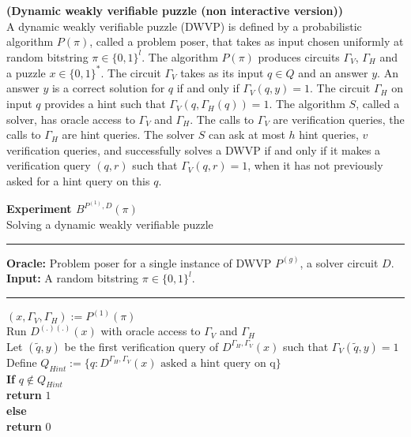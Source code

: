 %
%
%
\begin{definition} {\textbf{(Dynamic weakly verifiable puzzle (non interactive version))}}\\
  A dynamic weakly verifiable puzzle (DWVP) is defined by a probabilistic algorithm $P(\pi)$,
  called a problem poser, that takes as input chosen uniformly at random bitstring $\pi \in \{0,1\}^l$.
  The algorithm $P(\pi)$ produces circuits $\Gamma_{V}$, $\Gamma_{H}$ and a puzzle $x \in \{0,1\}^{*}$.
  The circuit $\Gamma_{V}$ takes as its input $q \in Q$ and an answer $y$.
  An answer $y$ is a correct solution for $q$ if and only if $\Gamma_V(q,y) = 1$.
  The circuit $\Gamma_H$ on input $q$ provides a hint such that $\Gamma_V(q,\Gamma_H(q)) = 1$.
  The algorithm $S$, called a solver, has oracle access to $\Gamma_V$ and $\Gamma_H$.
  The calls to $\Gamma_V$ are verification queries, the calls to $\Gamma_H$ are hint queries.
  The solver $S$ can ask at most $h$ hint queries, $v$ verification queries, and successfully solves a DWVP if and only if
  it makes a verification query $(q,r)$ such that $\Gamma_V(q,r) = 1$, when it has not previously asked for a hint query on this $q$.
\end{definition}
%
%
%
\begin{codeblock}
  \textbf{Experiment $B^{P^{(1)}, D}(\pi)$} \\
  Solving a dynamic weakly verifiable puzzle
  \medskip

  \hrule

  \medskip

  \textbf{Oracle:} Problem poser for a single instance of DWVP $P^{(g)}$, a solver circuit $D$. \\
  \textbf{Input:} A random bitstring $\pi \in \{0,1\}^{l}$.\\

  \medskip\hrule\medskip

  $(x, \Gamma_V, \Gamma_H) := P^{(1)}(\pi)$ \\
  Run $D^{(.)(.)}(x)$ with oracle access to $\Gamma_V$ and $\Gamma_H$ \\
  \IndI Let $(\widetilde{q},y)$ be the first verification query of $D^{\Gamma_H, \Gamma_V}(x)$ such that $\Gamma_V(\widetilde{q},y) = 1$ \\
  \IndI Define $Q_{Hint} := \{q: \text{$D^{\Gamma_H, \Gamma_V}(x)$ asked a hint query on q} \}$\\
  \textbf{If} $q \notin Q_{Hint}$\\
  \IndI \textbf{return} $1$\\
  \textbf{else}\\
  \IndI \textbf{return} $0$\\
\end{codeblock}
